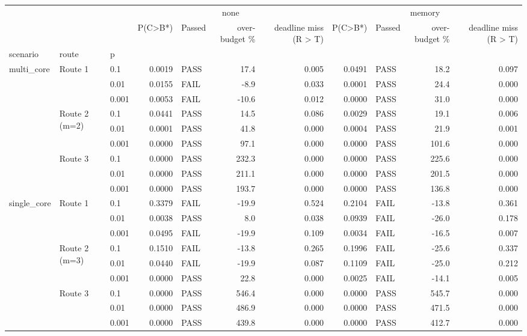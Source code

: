 \begin{tabular}{lllrlrrrlrr}
\toprule
 &  &  & \multicolumn{4}{c}{none} & \multicolumn{4}{c}{memory} \\
 &  &  & P(C>B*) & Passed & over-budget \% & deadline miss (R > T) & P(C>B*) & Passed & over-budget \% & deadline miss (R > T) \\
scenario & route & p &  &  &  &  &  &  &  &  \\
\midrule
\multirow[c]{9}{*}{multi\_core} & \multirow[c]{3}{*}{Route 1} & 0.1 & 0.0019 & PASS & 17.4 & 0.005 & 0.0491 & PASS & 18.2 & 0.097 \\
 &  & 0.01 & 0.0155 & FAIL & -8.9 & 0.033 & 0.0001 & PASS & 24.4 & 0.000 \\
 &  & 0.001 & 0.0053 & FAIL & -10.6 & 0.012 & 0.0000 & PASS & 31.0 & 0.000 \\
\cline{2-11}
 & \multirow[c]{3}{*}{Route 2 (m=2)} & 0.1 & 0.0441 & PASS & 14.5 & 0.086 & 0.0029 & PASS & 19.1 & 0.006 \\
 &  & 0.01 & 0.0001 & PASS & 41.8 & 0.000 & 0.0004 & PASS & 21.9 & 0.001 \\
 &  & 0.001 & 0.0000 & PASS & 97.1 & 0.000 & 0.0000 & PASS & 101.6 & 0.000 \\
\cline{2-11}
 & \multirow[c]{3}{*}{Route 3} & 0.1 & 0.0000 & PASS & 232.3 & 0.000 & 0.0000 & PASS & 225.6 & 0.000 \\
 &  & 0.01 & 0.0000 & PASS & 211.1 & 0.000 & 0.0000 & PASS & 201.5 & 0.000 \\
 &  & 0.001 & 0.0000 & PASS & 193.7 & 0.000 & 0.0000 & PASS & 136.8 & 0.000 \\
\cline{1-11} \cline{2-11}
\multirow[c]{9}{*}{single\_core} & \multirow[c]{3}{*}{Route 1} & 0.1 & 0.3379 & FAIL & -19.9 & 0.524 & 0.2104 & FAIL & -13.8 & 0.361 \\
 &  & 0.01 & 0.0038 & PASS & 8.0 & 0.038 & 0.0939 & FAIL & -26.0 & 0.178 \\
 &  & 0.001 & 0.0495 & FAIL & -19.9 & 0.109 & 0.0034 & FAIL & -16.5 & 0.007 \\
\cline{2-11}
 & \multirow[c]{3}{*}{Route 2 (m=3)} & 0.1 & 0.1510 & FAIL & -13.8 & 0.265 & 0.1996 & FAIL & -25.6 & 0.337 \\
 &  & 0.01 & 0.0440 & FAIL & -19.9 & 0.087 & 0.1109 & FAIL & -25.0 & 0.212 \\
 &  & 0.001 & 0.0000 & PASS & 22.8 & 0.000 & 0.0025 & FAIL & -14.1 & 0.005 \\
\cline{2-11}
 & \multirow[c]{3}{*}{Route 3} & 0.1 & 0.0000 & PASS & 546.4 & 0.000 & 0.0000 & PASS & 545.7 & 0.000 \\
 &  & 0.01 & 0.0000 & PASS & 486.9 & 0.000 & 0.0000 & PASS & 471.5 & 0.000 \\
 &  & 0.001 & 0.0000 & PASS & 439.8 & 0.000 & 0.0000 & PASS & 412.7 & 0.000 \\
\cline{1-11} \cline{2-11}
\bottomrule
\end{tabular}
